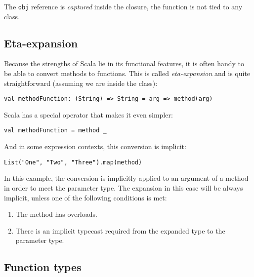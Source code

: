 The \lstinline|obj| reference is \textit{captured} inside the closure, the function is not tied to any class. 



\subsection{Eta-expansion}
\label{subsec:etaexpansion}

Because the strengths of Scala lie in its functional features, it is often handy to be able to convert methods to functions. This is called \textit{eta-expansion} and is quite straightforward (assuming we are inside the class):

\lstset{style=Scala}
\begin{lstlisting}
val methodFunction: (String) => String = arg => method(arg)
\end{lstlisting}

Scala has a special operator that makes it even simpler:

\lstset{style=Scala}
\begin{lstlisting}
val methodFunction = method _
\end{lstlisting}

And in some expression contexts, this conversion is implicit:

\lstset{style=Scala}
\begin{lstlisting}
List("One", "Two", "Three").map(method)
\end{lstlisting}

In this example, the conversion is implicitly applied to an argument of a method in order to meet the parameter type. The expansion in this case will be always implicit, unless one of the following conditions is met:
\begin{enumerate}
	\item The method has overloads.
	\item There is an implicit typecast required from the expanded type to the parameter type.
\end{enumerate}





\subsection{Function types}
\label{subsec:functiontypes}

